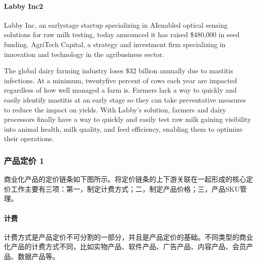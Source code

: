 \documentclass[letterpaper,10pt,english]{sphinxmanual}
\begin{document}
\paragraph{Labby Inc2\sphinxfootnotemark[685]}
\label{\detokenize{chapter_knowledge/Valuation:labby-inc2}}%
\begin{footnotetext}[685]\sphinxAtStartFootnote
{}
%
\end{footnotetext}\ignorespaces 
Labby Inc, an early\sphinxhyphen{}stage startup specializing in AI\sphinxhyphen{}enabled optical
sensing solutions for raw milk testing, today announced it has raised
\$480,000 in seed funding. AgriTech Capital, a strategy and investment
firm specializing in innovation and technology in the agribusiness
sector.

The global dairy farming industry loses \$32 billion annually due to
mastitis infections. At a minimum, twenty\sphinxhyphen{}five percent of cows each year
are impacted regardless of how well managed a farm is. Farmers lack a
way to quickly and easily identify mastitis at an early stage so they
can take preventative measures to reduce the impact on yields. With
Labby’s solution, farmers and dairy processors finally have a way to
quickly and easily test raw milk gaining visibility into animal health,
milk quality, and feed efficiency, enabling them to optimize their
operations.


\subsubsection{产品定价 1\sphinxfootnotemark[686]}
\label{\detokenize{chapter_knowledge/price:id1}}\label{\detokenize{chapter_knowledge/price::doc}}%
\begin{footnotetext}[686]\sphinxAtStartFootnote
{}
%
\end{footnotetext}\ignorespaces 
商业化产品的定价链条如下图所示。将定价链条的上下游关联在一起形成的核心定价工作主要有三项：第一，制定计费方式；二，制定产品价格；三，产品SKU管理。


\paragraph{计费}
\label{\detokenize{chapter_knowledge/price:id2}}
计费方式是产品定价不可分割的一部分，并且是产品定价的基础。不同类型的商业化产品的计费方式不同，比如实物产品、软件产品、广告产品、内容产品、会员产品、数据产品等。
\end{document}
